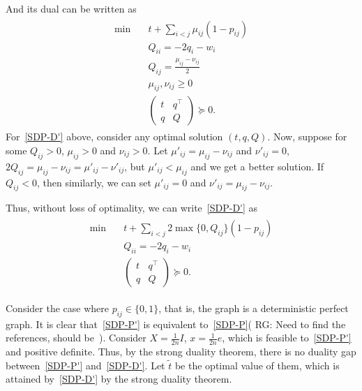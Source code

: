 \documentclass{article}
\newcommand{\rgnote}[1]{{\color{magenta} RG: #1}}
\begin{document}
And its dual can be written as
\begin{align}
\label{SDP-D'}
  \tag{SDP-D'}
  \begin{split}
    \min\quad &t+\sum_{i<j}\mu_{ij}(1-p_{ij})\\
    &Q_{ii}=-2q_i-w_i\\
    &Q_{ij}=\frac{\mu_{ij}-\nu_{ij}}{2}\\
    &\mu_{ij},\nu_{ij}\geq 0\\
    &\begin{pmatrix}
      t&q^\top\\
      q&Q
    \end{pmatrix}\succeq 0.
  \end{split}
\end{align}
For~\ref{SDP-D'} above, consider any optimal solution $(t,q,Q)$.
Now, suppose for some $Q_{ij}>0$, $\mu_{ij}>0$ and $\nu_{ij}>0$.
Let $\mu'_{ij}=\mu_{ij}-\nu_{ij}$ and $\nu'_{ij}=0$,
$2Q_{ij} = \mu_{ij}-\nu_{ij}=\mu'_{ij}-\nu'_{ij}$, but $\mu'_{ij}<\mu_{ij}$ and we get a better solution.
If $Q_{ij}<0$, then similarly, we can set $\mu'_{ij}=0$ and $\nu'_{ij}=\mu_{ij}-\nu_{ij}$.

Thus, without loss of optimality, we can write~\ref{SDP-D'} as 
\begin{align}
\label{SDP-DD}
  \tag{SDP-DD}
  \begin{split}
    \min\quad &t+\sum_{i<j}2\max\{0,Q_{ij}\}(1-p_{ij})\\
    &Q_{ii}=-2q_i-w_i\\
    &\begin{pmatrix}
      t&q^\top\\
      q&Q
    \end{pmatrix}\succeq 0.
  \end{split}
\end{align}

Consider the case where $p_{ij}\in\{0,1\}$, that is, the graph is a deterministic perfect graph.
It is clear that~\ref{SDP-P'} is equivalent to~\ref{SDP-P}(\rgnote{Need to find the references, should be~\cite{1056072}}).
Consider $X=\frac{1}{2n}I$, $x=\frac{1}{2n}e$, which is feasible to~\ref{SDP-P'} and positive definite. 
Thus, by the strong duality theorem, there is no duality gap between~\ref{SDP-P'} and~\ref{SDP-D'}.
Let $\tilde{t}$ be the optimal value of them, which is attained by~\ref{SDP-D'} by the strong duality theorem.
\end{document}
